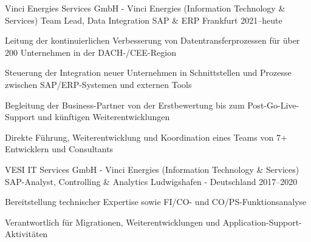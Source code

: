 

\begin{cventries}
  \cventry
    {Vinci Energies Services GmbH - Vinci Energies (Information Technology \& Services)} %
    {Team Lead, Data Integration SAP \& ERP} %
    {Frankfurt} %
    {2021--heute} %
    {
      \begin{cvitems} %
        \item {Leitung der kontinuierlichen Verbesserung von Datentransferprozessen für über 200 Unternehmen in der DACH-/CEE-Region}
        \item {Steuerung der Integration neuer Unternehmen in Schnittstellen und Prozesse zwischen SAP/ERP-Systemen und externen Tools}
        \item {Begleitung der Business-Partner von der Erstbewertung bis zum Post-Go-Live-Support und künftigen Weiterentwicklungen}
        \item {Direkte Führung, Weiterentwicklung und Koordination eines Teams von 7+ Entwicklern und Consultants}
      \end{cvitems}
    }

  \cventry
    {VESI IT Services GmbH - Vinci Energies (Information Technology \& Services)} %
    {SAP-Analyst, Controlling \& Analytics} %
    {Ludwigshafen - Deutschland} %
    {2017--2020} %
    {
      \begin{cvitems} %
        \item {Bereitstellung technischer Expertise sowie FI/CO- und CO/PS-Funktionsanalyse}
        \item {Verantwortlich für Migrationen, Weiterentwicklungen und Application-Support-Aktivitäten}
      \end{cvitems}
    }


\end{cventries}

